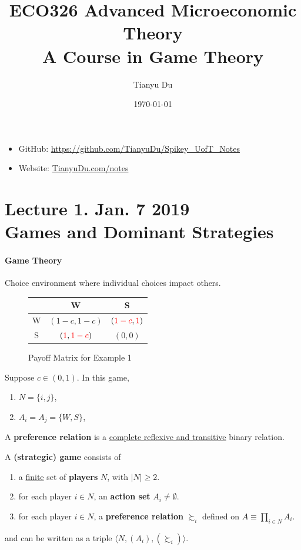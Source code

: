 \documentclass[11pt]{article}
\title{ECO326 Advanced Microeconomic Theory \\ \small A Course in Game Theory}
\author{Tianyu Du}
\date{\today}
\begin{document}
	\maketitle
	\doclicenseThis
	\begin{itemize}
		\item GitHub: \url{https://github.com/TianyuDu/Spikey_UofT_Notes}
		\item Website: \url{TianyuDu.com/notes}
	\end{itemize}
	
	\tableofcontents
	\newpage
	
	\section{Lecture 1. Jan. 7 2019\\Games and Dominant Strategies}
		\paragraph{Game Theory} Choice environment where individual choices impact others.
		
		\begin{example}
			\begin{figure}[h]
				\centering
				  \begin{tabular}{c|c|c}
				    & W & S\\
				    \hline
				    W & $(1-c, 1-c)$ & $(\textcolor{red}{1-c}, \textcolor{red}{1})$ \\
				    \hline
				    S & $(\textcolor{red}{1}, \textcolor{red}{1-c})$ & $(0, 0)$
				  \end{tabular}
				  \caption{Payoff Matrix for Example 1}
			\end{figure}
		\end{example}
		Suppose $c \in (0, 1)$. In this game,
		\begin{enumerate}[i]
			\item $N = \{i, j\}$,
			\item $A_i = A_j = \{W, S\}$,
		\end{enumerate}
		
		\begin{definition}[pg.7]
			A \textbf{preference relation} is a \ul{complete reflexive and transitive} binary relation.
		\end{definition}
		
		\begin{definition}[11.1, lec.1]
			A \textbf{(strategic) game} consists of
			\begin{enumerate}[i]
				\item a \ul{finite} set of \textbf{players} $N$, with $|N| \geq 2$.
				\item for each player $i \in N$, an \textbf{action set} $A_i \neq \emptyset$.
				\item for each player $i \in N$, a \textbf{preference relation} $\succsim_i$ defined on $A \equiv \prod_{i\in N}A_i$.
			\end{enumerate}
			and can be written as a triple $\langle N, (A_i), (\succsim_i) \rangle$.
		\end{definition}
\end{document}

